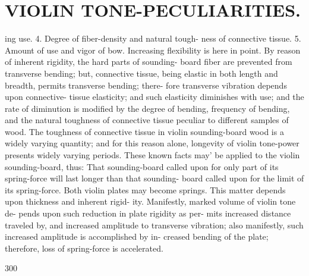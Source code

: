 \documentclass{article}
\begin{document}
\section*{VIOLIN TONE-PECULIARITIES.}
ing use. 4. Degree of fiber-density and natural tough- ness of connective tissue. 5. Amount of use and vigor of bow. Increasing flexibility is here in point. By reason of inherent rigidity, the hard parts of sounding- board fiber are prevented from transverse bending; but, connective tissue, being elastic in both length and breadth, permits transverse bending; there- fore transverse vibration depends upon connective- tissue elasticity; and such elasticity diminishes with use; and the rate of diminution is modified by the degree of bending, frequency of bending, and the natural toughness of connective tissue peculiar to different samples of wood. The toughness of connective tissue in violin sounding-board wood is a widely varying quantity; and for this reason alone, longevity of violin tone-power presents widely varying periods. These known facts may' be applied to the violin sounding-board, thus: That sounding-board called upon for only part of its spring-force will last longer than that sounding- board called upon for the limit of its spring-force. Both violin plates may become springs. This matter depends upon thickness and inherent rigid- ity. Manifestly, marked volume of violin tone de- pends upon such reduction in plate rigidity as per- mits increased distance traveled by, and increased amplitude to transverse vibration; also manifestly, such increased amplitude is accomplished by in- creased bending of the plate; therefore, loss of spring-force is accelerated.

300
\end{document}
